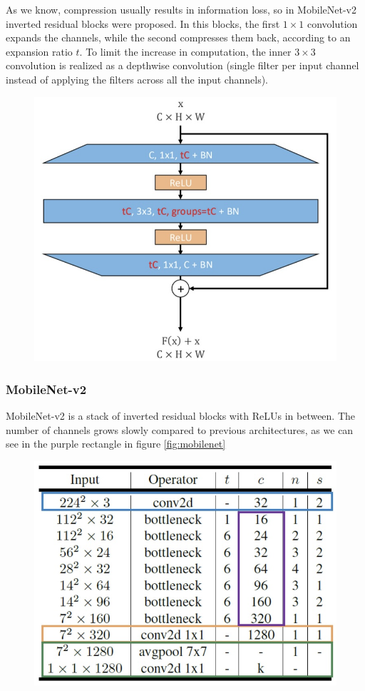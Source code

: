 \documentclass{article}
\begin{document}
As we know, compression usually results in information loss, so in MobileNet-v2 inverted residual blocks were proposed.
In this blocks, the first $1\times 1$ convolution expands the channels, while the second compresses them back, according to an expansion ratio $t$.
To limit the increase in computation, the inner $3\times 3$ convolution is realized as a depthwise convolution (single filter per input channel instead of applying the filters across all the input channels).

\begin{figure}[htbp]
  \centering
  \includegraphics[width=0.8\linewidth]{./img/inverted_residual.jpg}
\end{figure}

\subsubsection{MobileNet-v2}
MobileNet-v2 is a stack of inverted residual blocks with ReLUs in between.
The number of channels grows slowly compared to previous architectures, as we can see in the purple rectangle in figure \ref{fig:mobilenet}

\begin{figure}[htbp]
  \centering
  \includegraphics[width=0.8\linewidth]{./img/mobilenet.jpg}
  \label{ref:mobilenet}
\end{figure}
\end{document}
